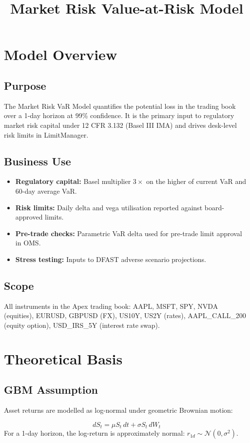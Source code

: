 \documentclass{apex_mdd}
\title{Market Risk Value-at-Risk Model}
\begin{document}
\maketitle
\statusbadge

\tableofcontents
\newpage

\section{Model Overview}

\subsection{Purpose}
The Market Risk VaR Model quantifies the potential loss in the trading book over a 1-day horizon at 99\% confidence. It is the primary input to regulatory market risk capital under 12 CFR 3.132 (Basel III IMA) and drives desk-level risk limits in LimitManager.

\subsection{Business Use}
\begin{itemize}
  \item \textbf{Regulatory capital:} Basel multiplier $3\times$ on the higher of current VaR and 60-day average VaR.
  \item \textbf{Risk limits:} Daily delta and vega utilisation reported against board-approved limits.
  \item \textbf{Pre-trade checks:} Parametric VaR delta used for pre-trade limit approval in OMS.
  \item \textbf{Stress testing:} Inputs to DFAST adverse scenario projections.
\end{itemize}

\subsection{Scope}
All instruments in the Apex trading book: AAPL, MSFT, SPY, NVDA (equities), EURUSD, GBPUSD (FX), US10Y, US2Y (rates), AAPL\_CALL\_200 (equity option), USD\_IRS\_5Y (interest rate swap).

\section{Theoretical Basis}

\subsection{GBM Assumption}
Asset returns are modelled as log-normal under geometric Brownian motion:
\begin{formulabox}
\[
  dS_t = \mu S_t\,dt + \sigma S_t\,dW_t
\]
For a 1-day horizon, the log-return is approximately normal: $r_{1d} \sim \mathcal{N}(0,\sigma^2)$.
\end{formulabox}
\end{document}
